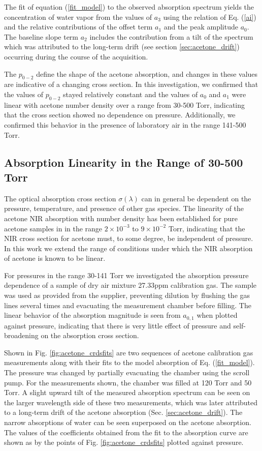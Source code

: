 \documentclass[12pt]{report}
\begin{document}
	The fit of equation (\ref{fit_model}) to the observed absorption spectrum yields the concentration of water vapor from the values of $a_{3}$ using the relation of Eq. (\ref{ai}) and the relative contributions of the offset term $a_1$ and the peak amplitude $a_0$. The baseline slope term $a_2$ includes the contribution from a tilt of the spectrum which was attributed to the long-term drift (see section \ref{sec:acetone_drift}) occurring during the course of the acquisition.
	
	The $p_{0-2}$ define the shape of the acetone absorption, and changes in these values are indicative of a changing cross section. In this investigation, we confirmed that the values of $p_{0-2}$ stayed relatively constant and the values of $a_0$ and $a_1$ were linear with acetone number density over a range from 30-500 Torr, indicating that the cross section showed no dependence on pressure. Additionally, we confirmed this behavior in the presence of laboratory air in the range 141-500 Torr.
	
	\subsection{Absorption Linearity in the Range of 30-500 Torr}
	The optical absorption cross section $\sigma(\lambda)$ can in general be dependent on the pressure, temperature, and presence of other gas species. The linearity of the acetone NIR absorption with number density has been established for pure acetone samples in \cite{Wang_2004} in the range $2\times10^{-3}$ to $9\times10^{-2}$ Torr, indicating that the NIR cross section for acetone must, to some degree, be independent of pressure. In this work we extend the range of conditions under which the NIR absorption of acetone is known to be linear.
	
	For pressures in the range 30-141 Torr we investigated the absorption pressure dependence of a sample of dry air mixture 27.33ppm calibration gas. The sample was used as provided from the supplier, preventing dilution by flushing the gas lines several times and evacuating the measurement chamber before filling. The linear behavior of the absorption magnitude is seen from $a_{0,1}$ when plotted against pressure, indicating that there is very little effect of pressure and self-broadening on the absorption cross section.
	
	Shown in Fig. \ref{fig:acetone_crdsfits} are two sequences of acetone calibration gas measurements along with their fits to the model absorption of Eq. (\ref{fit_model}). The pressure was changed by partially evacuating the chamber using the scroll pump. For the measurements shown, the chamber was filled at 120 Torr and 50 Torr. A slight upward tilt of the measured absorption spectrum can be seen on the larger wavelength side of these two measurements, which was later attributed to a long-term drift of the acetone absorption (Sec. \ref{sec:acetone_drift}). The narrow absorptions of water can be seen superposed on the acetone absorption. The values of the coefficients obtained from the fit to the absorption curve are shown as by the points of Fig. \ref{fig:acetone_crdsfits} plotted against pressure.
	
\end{document}
